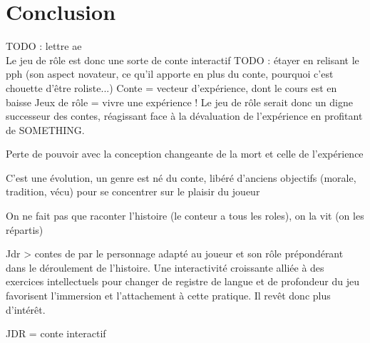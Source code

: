 \section*{Conclusion}

TODO : lettre ae\\
Le jeu de rôle est donc une sorte de conte interactif
TODO : étayer en relisant le pph (son aspect novateur, ce qu'il apporte en plus du conte, pourquoi c'est chouette d'être roliste...)
Conte = vecteur d'expérience, dont le cours est en baisse
Jeux de rôle = vivre une expérience !
Le jeu de rôle serait donc un digne successeur des contes, réagissant face à la dévaluation de l'expérience en profitant de SOMETHING.

Perte de pouvoir avec la conception changeante de la mort et celle de l'expérience

C'est une évolution, un genre est né du conte, libéré d'anciens objectifs (morale, tradition, vécu) pour se concentrer sur le plaisir du joueur

On ne fait pas que raconter l'histoire (le conteur a tous les roles), on la vit (on les répartis)

Jdr > contes de par le personnage adapté au joueur et son rôle prépondérant dans le déroulement de l'histoire. Une interactivité croissante alliée à des exercices intellectuels pour changer de registre de langue et de profondeur du jeu favorisent l'immersion et l'attachement à cette pratique. Il revêt donc plus d'intérêt.

JDR = conte interactif


\clearpage
